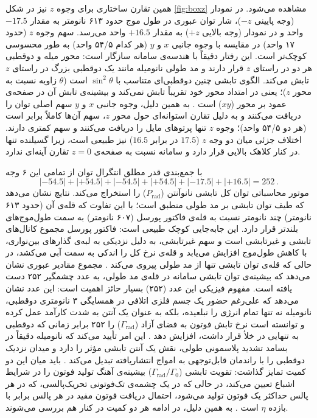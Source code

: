 \documentclass[12pt,a4paper]{report}
\newcommand{\sub}[1]{\mathrm{#1}}               %
\begin{document}
همین تقارن ساختاری برای وجوه $z$ نیز در شکل \ref{fig:boxz} مشاهده می‌شود. در نمودار  (وجه پایینی $-z$)، شار توان عبوری در طول موج حدود ۶۱۳ نانومتر به مقدار $-17.5$ واحد و در نمودار  (وجه بالایی $+z$) به مقدار $+16.5$ واحد می‌رسد. سهم وجوه $z$ (حدود ۱۷ واحد) در مقایسه با وجوه جانبی $x$ و $y$ (هر کدام ۵۴/۵ واحد) به طور محسوسی کوچک‌تر است. این رفتار دقیقاً با هندسه‌ی سامانه سازگار است: محور میله و دوقطبی هر دو در راستای $z$ قرار دارند و مد طولی نانومیله مانند یک دوقطبی بزرگ در راستای $z$ تابش می‌کند. الگوی تابشی چنین دوقطبی‌ای متناسب با $\sin^2\theta$ است ($\theta$ زاویه نسبت به محور $z$)؛ یعنی در امتداد محور خود تقریباً تابش نمی‌کند و بیشینه‌ی تابش آن در صفحه‌ی عمود بر محور ($xy$) است \cite{novotny}. به همین دلیل، وجوه جانبی $x$ و $y$ سهم اصلی توان را دریافت می‌کنند و به دلیل تقارن استوانه‌ای حول محور $z$، سهم آن‌ها کاملاً برابر است (هر دو ۵۴/۵ واحد)؛ وجوه $z$ تنها پرتوهای مایل را دریافت می‌کنند و سهم کمتری دارند. اختلاف جزئی میان دو وجه $z$ ($17.5$ در برابر $16.5$) نیز طبیعی است، زیرا گسیلنده تنها در کنار کلاهک بالایی قرار دارد و سامانه نسبت به صفحه‌ی $z=0$ تقارن آینه‌ای ندارد.

با جمع‌بندی قدر مطلق انتگرال توان از تمامی این ۶ وجه
\[
|{-54.5}|+|{+54.5}|+|{-54.5}|+|{+54.5}|+|{-17.5}|+|{+16.5}|=252\,.\]
موتور محاسباتی  توان کل تابشی نانوآنتن ($P_{\sub{rad}}$) را استخراج می‌کند. نتایج نشان می‌دهد که طیف توان تابشی بر مد طولی منطبق است؛ با این تفاوت که قله‌ی آن (حدود ۶۱۳ نانومتر) چند نانومتر نسبت به قله‌ی فاکتور پورسل (۶۰۷ نانومتر) به سمت طول‌موج‌های بلندتر قرار دارد. این جابه‌جایی کوچک طبیعی است: فاکتور پورسل مجموع کانال‌های تابشی و غیرتابشی است و سهم غیرتابشی، به دلیل نزدیکی به لبه‌ی گذارهای بین‌نواری، با کاهش طول‌موج افزایش می‌یابد و قله‌ی نرخ کل را اندکی به سمت آبی می‌کشد، در حالی که قله‌ی توان تابشی تنها از مد طولی پیروی می‌کند \cite{novotny,koenderink}. مجموع مقادیر عبوری نشان می‌دهد که بیشینه‌ی توان تابشی سامانه در قله‌ی مد طولی، به عدد چشمگیر ۲۵۲ دست یافته است. مفهوم فیزیکی این عدد (۲۵۲) بسیار حائز اهمیت است: این عدد نشان می‌دهد که علی‌رغم حضور یک جسم فلزی اتلافی در همسایگی ۳ نانومتری دوقطبی، نانومیله نه تنها تمام انرژی را نبلعیده، بلکه به عنوان یک آنتن به شدت کارآمد عمل کرده و توانسته است نرخ تابش فوتون به فضای آزاد ($\Gamma_{\sub{rad}}$) را ۲۵۲ برابر زمانی که دوقطبی به تنهایی در خلأ قرار داشت، افزایش دهد \cite{novotny,anger}. این امر تأیید می‌کند که نانومیله دقیقاً در بسامد تشدید پلاسمونی طولی، نقش یک آنتن تابشی مؤثر را دارد و میدان نزدیک دوقطبی را با راندمان قابل‌توجهی به امواج انتشاریافته تبدیل می‌کند \cite{maier,novotny}. باید میان این دو کمیت تمایز گذاشت: تقویت تابشی ($\Gamma_{\sub{rad}}/\Gamma_0$) بیشینه‌ی آهنگ تولید فوتون را در شرایط اشباع تعیین می‌کند، در حالی که در یک چشمه‌ی تک‌فوتونی تحریک‌پالسی، که در هر پالس حداکثر یک فوتون تولید می‌شود، احتمال دریافت فوتون مفید در هر پالس برابر با بازده $\eta$ است \cite{koenderink,novotny}. به همین دلیل، در ادامه هر دو کمیت در کنار هم بررسی می‌شوند.
\end{document}
